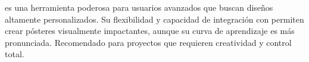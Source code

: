  es una herramienta poderosa para usuarios avanzados que buscan diseños altamente personalizados. Su flexibilidad y capacidad de integración con  permiten crear pósteres visualmente impactantes, aunque su curva de aprendizaje es más pronunciada. Recomendado para proyectos que requieren creatividad y control total.